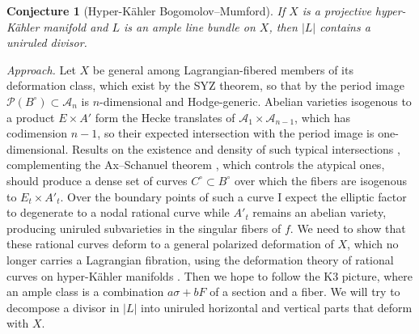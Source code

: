 \documentclass[11pt]{article}
\newcommand{\cA}{\mathcal{A}}
\newcommand{\cP}{\mathcal{P}}
\theoremstyle{compact}
\newtheorem*{conjecture*}{Conjecture}
\begin{document}
\begin{conjecture*}[Hyper-K\"ahler Bogomolov--Mumford] 
If $X$ is a projective hyper-K\"ahler manifold and $L$ is an ample line bundle on $X$, then
$|L|$ contains a uniruled divisor.
\end{conjecture*}

\emph{Approach.} Let $X$ be general among Lagrangian-fibered members of its deformation
class, which exist by the SYZ theorem, so that by  the period image $\cP(B^\circ)\subset\cA_n$ is
$n$-dimensional and Hodge-generic. Abelian varieties isogenous to a product $E\times A'$
form the Hecke translates of $\cA_1\times\cA_{n-1}$, which has codimension $n-1$, so their
expected intersection with the period image is one-dimensional. Results on the existence
and density of such typical intersections \cite{khelifa-urbanik23,eterovic-scanlon25},
complementing the Ax--Schanuel theorem \cite{bakker-tsimerman19}, which controls the
atypical ones, should produce a dense set of curves $C^\circ\subset B^\circ$ over which the fibers are isogenous to $E_t\times A'_t$.
Over the boundary points of such a curve I expect the elliptic factor to degenerate to a
nodal rational curve while $A'_t$ remains an abelian variety, producing uniruled
subvarieties in the singular fibers of $f$. We need to show that these rational
curves deform to a general polarized deformation of $X$, which no longer carries a
Lagrangian fibration, using the deformation theory of rational curves on hyper-K\"ahler
manifolds \cite{cmp19}. Then we hope to follow the K3 picture, where an ample class is 
a combination $a\sigma+bF$ of a section and a fiber. We will try to decompose a divisor 
in $|L|$ into uniruled horizontal and vertical parts that deform with $X$.


\end{document}

